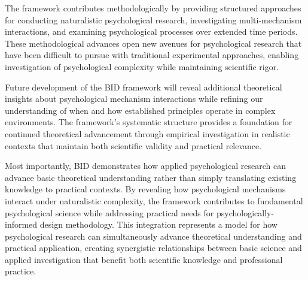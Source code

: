 \documentclass[
  authoryear,
  preprint]{elsarticle}
\begin{document}
The framework contributes methodologically by providing structured
approaches for conducting naturalistic psychological research,
investigating multi-mechanism interactions, and examining psychological
processes over extended time periods. These methodological advances open
new avenues for psychological research that have been difficult to
pursue with traditional experimental approaches, enabling investigation
of psychological complexity while maintaining scientific rigor.

Future development of the BID framework will reveal additional
theoretical insights about psychological mechanism interactions while
refining our understanding of when and how established principles
operate in complex environments. The framework's systematic structure
provides a foundation for continued theoretical advancement through
empirical investigation in realistic contexts that maintain both
scientific validity and practical relevance.

Most importantly, BID demonstrates how applied psychological research
can advance basic theoretical understanding rather than simply
translating existing knowledge to practical contexts. By revealing how
psychological mechanisms interact under naturalistic complexity, the
framework contributes to fundamental psychological science while
addressing practical needs for psychologically-informed design
methodology. This integration represents a model for how psychological
research can simultaneously advance theoretical understanding and
practical application, creating synergistic relationships between basic
science and applied investigation that benefit both scientific knowledge
and professional practice.



\end{document}
